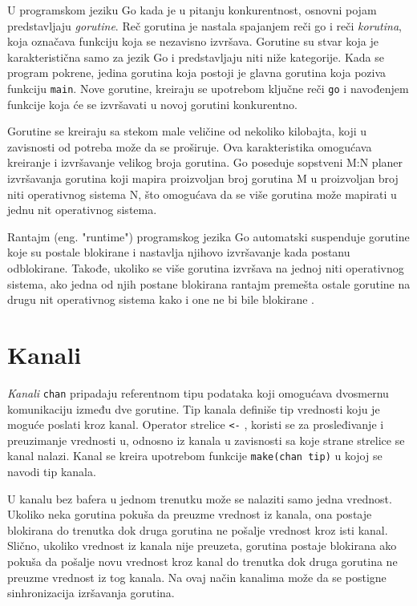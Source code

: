 \documentclass[12pt,oneside]{memoir}
\begin{document}
U programskom jeziku Go kada je u pitanju konkurentnost, osnovni pojam predstavljaju \textit{gorutine}. Reč gorutina je nastala spajanjem reči go i reči \textit{korutina}, koja označava funkciju koja se nezavisno izvršava. Gorutine su stvar koja je karakteristična samo za jezik Go i predstavljaju niti niže kategorije. Kada se program pokrene, jedina gorutina koja postoji je glavna gorutina koja poziva funkciju \texttt{main}. Nove gorutine, kreiraju se upotrebom ključne reči \texttt{go} i navođenjem funkcije koja će se izvršavati u novoj gorutini konkurentno. 

Gorutine se kreiraju sa stekom male veličine od nekoliko kilobajta, koji u zavisnosti od potreba može da se proširuje. Ova karakteristika omogućava kreiranje i izvršavanje velikog broja gorutina. Go poseduje sopstveni M:N planer izvršavanja gorutina koji mapira proizvoljan broj gorutina M u proizvoljan broj niti operativnog sistema N, što omogućava da se više gorutina može mapirati u jednu nit operativnog sistema. 

Rantajm (eng. "runtime") programskog jezika Go automatski suspenduje gorutine koje su postale blokirane i nastavlja njihovo izvršavanje kada postanu odblokirane. Takođe, ukoliko se više gorutina izvršava na jednoj niti operativnog sistema, ako jedna od njih postane blokirana rantajm premešta ostale gorutine na drugu nit operativnog sistema kako i one ne bi bile blokirane \cite{bookConc}. 

\section{Kanali} \label{chanel}

\textit{Kanali} \texttt{chan} pripadaju referentnom tipu podataka koji omogućava dvosmernu komunikaciju između dve gorutine. Tip kanala definiše tip vrednosti koju je moguće poslati kroz kanal. Operator strelice \texttt{<-} , koristi se za prosleđivanje i preuzimanje vrednosti u, odnosno iz kanala u zavisnosti sa koje strane strelice se kanal nalazi. Kanal se kreira upotrebom funkcije \texttt{make(chan tip)} u kojoj se navodi tip kanala.

U kanalu bez bafera u jednom trenutku može se nalaziti samo jedna vrednost. Ukoliko neka gorutina pokuša da preuzme vrednost iz kanala, ona postaje blokirana do trenutka dok druga gorutina ne pošalje vrednost kroz isti kanal. Slično, ukoliko vrednost iz kanala nije preuzeta, gorutina postaje blokirana ako pokuša da pošalje novu vrednost kroz kanal do trenutka dok druga gorutina ne preuzme vrednost iz tog kanala. Na ovaj način kanalima može da se postigne sinhronizacija izršavanja gorutina.
\end{document}
